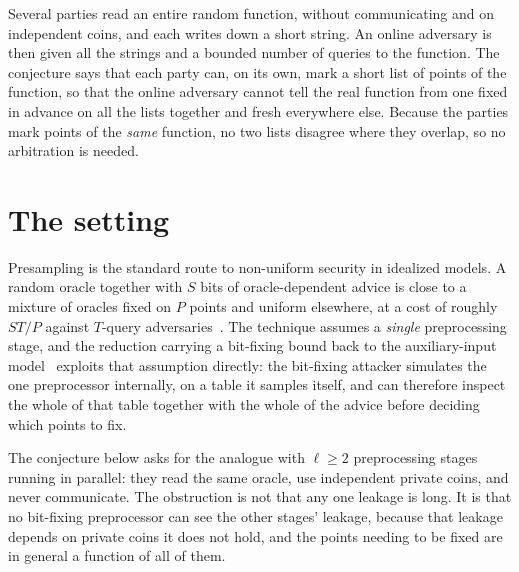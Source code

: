 \documentclass{conjura-conjecture}
\begin{document}

\vspace{0.4em}

\begin{informalconjecture}
Several parties read an entire random function, without communicating and
on independent coins, and each writes down a short string. An online
adversary is then given all the strings and a bounded number of queries to
the function. The conjecture says that each party can, on its own, mark a
short list of points of the function, so that the online adversary cannot
tell the real function from one fixed in advance on all the lists together
and fresh everywhere else. Because the parties mark points of the
\emph{same} function, no two lists disagree where they overlap, so no
arbitration is needed.
\end{informalconjecture}

\section{The setting}\label{sec:setting}

Presampling is the standard route to non-uniform security in idealized
models. A random oracle together with $S$ bits of oracle-dependent advice
is close to a mixture of oracles fixed on $P$ points and uniform
elsewhere, at a cost of roughly $ST/P$ against $T$-query
adversaries~\cite{Unruh,DGK,CDGS}. The technique assumes a \emph{single}
preprocessing stage, and the reduction carrying a bit-fixing bound back to
the auxiliary-input model~\cite[Thm.~5]{CDGS} exploits that assumption
directly: the bit-fixing attacker simulates the one preprocessor
internally, on a table it samples itself, and can therefore inspect the
whole of that table together with the whole of the advice before deciding
which points to fix.

The conjecture below asks for the analogue with $\ell \ge 2$ preprocessing
stages running in parallel: they read the same oracle, use independent
private coins, and never communicate. The obstruction is not that any one
leakage is long. It is that no bit-fixing preprocessor can see the other
stages' leakage, because that leakage depends on private coins it does not
hold, and the points needing to be fixed are in general a function of all
of them.
\end{document}
